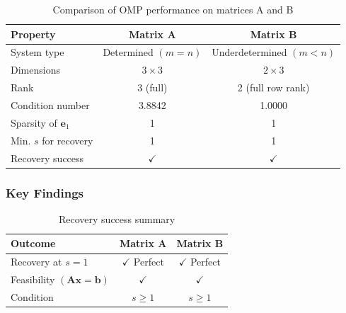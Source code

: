 \begin{table}[h]
\centering
\begin{tabular}{lcc}
\toprule
Property & Matrix A & Matrix B \\
\midrule
System type & Determined $(m=n)$ & Underdetermined $(m<n)$ \\
Dimensions & $3 \times 3$ & $2 \times 3$ \\
Rank & 3 (full) & 2 (full row rank) \\
Condition number & 3.8842 & 1.0000 \\
Sparsity of $\mathbf{e}_1$ & 1 & 1 \\
Min. $s$ for recovery & 1 & 1 \\
Recovery success & $\checkmark$ & $\checkmark$ \\
\bottomrule
\end{tabular}
\caption{Comparison of OMP performance on matrices A and B}
\end{table}

\subsubsection*{Key Findings}

\begin{table}[h]
\centering
\begin{tabular}{lcc}
\toprule
Outcome & Matrix A & Matrix B \\
\midrule
Recovery at $s=1$ & $\checkmark$ Perfect & $\checkmark$ Perfect \\
Feasibility $(\mathbf{Ax}=\mathbf{b})$ & $\checkmark$ & $\checkmark$ \\
Condition & $s \geq 1$ & $s \geq 1$ \\
\bottomrule
\end{tabular}
\caption{Recovery success summary}
\end{table}

\vspace{0.5em}

\noindent{}

